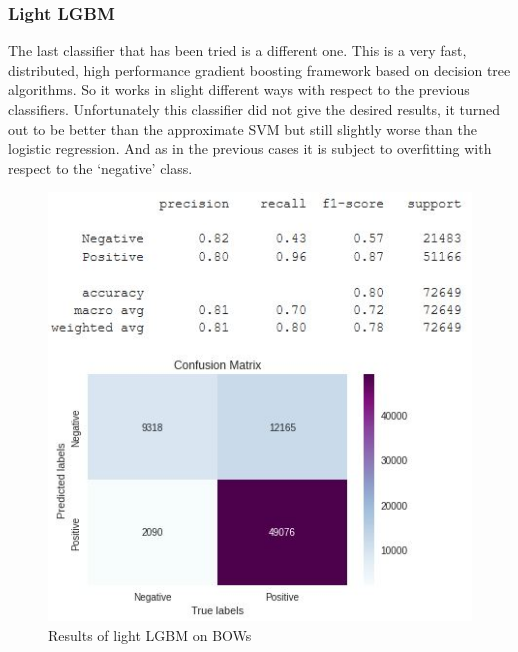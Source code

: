 \documentclass[11pt]{article}
\begin{document}
\subsubsection{Light LGBM}
The last classifier that has been tried is a different one. This is a very fast, distributed, high performance gradient boosting framework based on decision tree algorithms. So it works in slight different ways with respect to the previous classifiers. Unfortunately this classifier did not give the desired results, it turned out to be better than the approximate SVM but still slightly worse than the logistic regression. And as in the previous cases it is subject to overfitting with respect to the `negative' class.
\begin{figure}[H]
	\begin{minipage}[b]{0.48\textwidth}
		\centering
		\includegraphics[width=\textwidth]{light_bow.JPG}
		{Results of light LGBM on BOWs}
	\end{minipage}
	\hfill
	\begin{minipage}[b]{0.48\textwidth}
		\centering

\end{minipage}
\end{figure}
\end{document}
